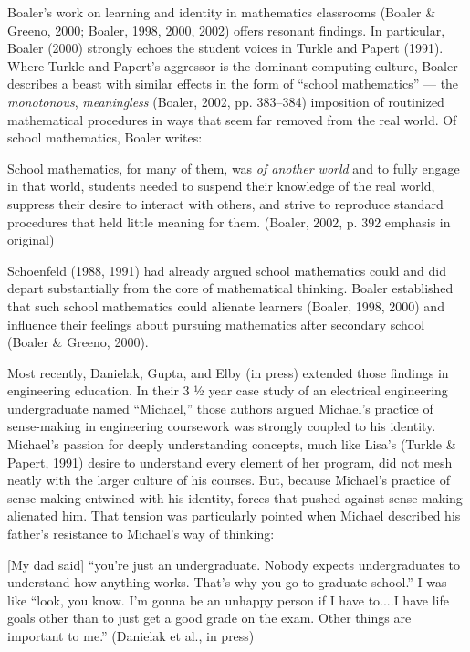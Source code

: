 Boaler's work on learning and identity in mathematics classrooms (Boaler
\& Greeno, 2000; Boaler, 1998, 2000, 2002) offers resonant findings. In
particular, Boaler (2000) strongly echoes the student voices in Turkle
and Papert (1991). Where Turkle and Papert's aggressor is the dominant
computing culture, Boaler describes a beast with similar effects in the
form of ``school mathematics'' --- the \emph{monotonous},
\emph{meaningless} (Boaler, 2002, pp. 383--384) imposition of routinized
mathematical procedures in ways that seem far removed from the real
world. Of school mathematics, Boaler writes:

School mathematics, for many of them, was \emph{of another world} and to
fully engage in that world, students needed to suspend their knowledge
of the real world, suppress their desire to interact with others, and
strive to reproduce standard procedures that held little meaning for
them. (Boaler, 2002, p. 392 emphasis in original)

Schoenfeld (1988, 1991) had already argued school mathematics could and
did depart substantially from the core of mathematical thinking. Boaler
established that such school mathematics could alienate learners
(Boaler, 1998, 2000) and influence their feelings about pursuing
mathematics after secondary school (Boaler \& Greeno, 2000).

Most recently, Danielak, Gupta, and Elby (in press) extended those
findings in engineering education. In their 3 ½ year case study of an
electrical engineering undergraduate named ``Michael,'' those authors
argued Michael's practice of sense-making in engineering coursework was
strongly coupled to his identity. Michael's passion for deeply
understanding concepts, much like Lisa's (Turkle \& Papert, 1991) desire
to understand every element of her program, did not mesh neatly with the
larger culture of his courses. But, because Michael's practice of
sense-making entwined with his identity, forces that pushed against
sense-making alienated him. That tension was particularly pointed when
Michael described his father's resistance to Michael's way of thinking:

{[}My dad said{]} ``you're just an undergraduate. Nobody expects
undergraduates to understand how anything works. That's why you go to
graduate school.'' I was like ``look, you know. I'm gonna be an unhappy
person if I have to....I have life goals other than to just get a good
grade on the exam. Other things are important to me.'' (Danielak et al.,
in press)

